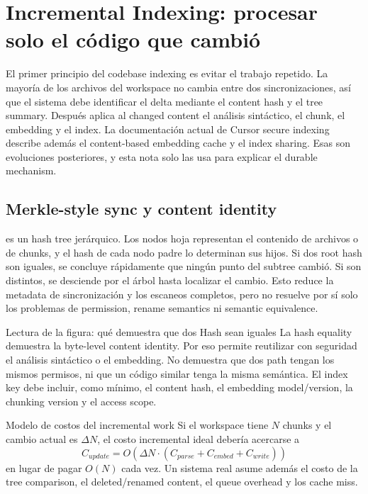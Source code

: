 \section{Incremental Indexing: procesar solo el código que cambió}

El primer principio del codebase indexing es evitar el trabajo repetido. La mayoría de los archivos del workspace no cambia entre dos sincronizaciones, así que el sistema debe identificar el delta mediante el content hash y el tree summary. Después aplica al changed content el análisis sintáctico, el chunk, el embedding y el index. La documentación actual de Cursor secure indexing describe además el content-based embedding cache y el index sharing. Esas son evoluciones posteriores, y esta nota solo las usa para explicar el durable mechanism.

\subsection{Merkle-style sync y content identity}

 es un hash tree jerárquico. Los nodos hoja representan el contenido de archivos o de chunks, y el hash de cada nodo padre lo determinan sus hijos. Si dos root hash son iguales, se concluye rápidamente que ningún punto del subtree cambió. Si son distintos, se desciende por el árbol hasta localizar el cambio. Esto reduce la metadata de sincronización y los escaneos completos, pero no resuelve por sí solo los problemas de permission, rename semantics ni semantic equivalence.


\begin{knowledgebox}{Lectura de la figura: qué demuestra que dos Hash sean iguales}
La hash equality demuestra la byte-level content identity. Por eso permite reutilizar con seguridad el análisis sintáctico o el embedding. No demuestra que dos path tengan los mismos permisos, ni que un código similar tenga la misma semántica. El index key debe incluir, como mínimo, el content hash, el embedding model/version, la chunking version y el access scope.
\end{knowledgebox}

\begin{importantbox}{Modelo de costos del incremental work}
Si el workspace tiene $N$ chunks y el cambio actual es $\Delta N$, el costo incremental ideal debería acercarse a
\[
C_{update}=O(\Delta N\cdot(C_{parse}+C_{embed}+C_{write}))
\]
en lugar de pagar $O(N)$ cada vez. Un sistema real asume además el costo de la tree comparison, el deleted/renamed content, el queue overhead y los cache miss.
\end{importantbox}

